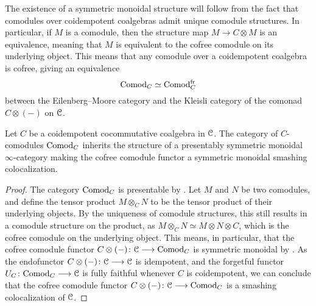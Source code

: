 \begin{remark}
    \label{ch2:rm:unique-structure}
    The existence of a symmetric monoidal structure will follow from the fact that comodules over coidempotent coalgebras admit unique comodule structures. In particular, if $M$ is a comodule, then the structure map $M \to C\otimes M$ is an equivalence, meaning that $M$ is equivalent to the cofree comodule on its underlying object. This means that any comodule over a coidempotent coalgebra is cofree, giving an equivalence 
    \[\mathrm{Comod}_C \simeq \mathrm{Comod}_C^{\mathrm{fr}}\]
    between the Eilenberg--Moore category and the Kleisli category of the comonad $C\otimes (-)$ on $\EuScript{C}$. 
\end{remark}

\begin{lemma}
    \label{ch2:lm:coidempotent-then-comod-monoidal}
    Let $C$ be a coidempotent cocommutative coalgebra in $\EuScript{C}$. The category of $C$-comodules $\mathrm{Comod}_C$ inherits the structure of a presentably symmetric monoidal $\infty$-category making the cofree comodule functor a symmetric monoidal smashing colocalization.
\end{lemma}
\begin{proof}
    The category $\mathrm{Comod}_C$ is presentable by \cite[2.1.11]{peroux_2020}. Let $M$ and $N$ be two comodules, and define the tensor product $M\otimes_C N$ to be the tensor product of their underlying objects. By the uniqueness of comodule structures, this still results in a comodule structure on the product, as $M \otimes_C N \simeq M \otimes N \otimes C$, which is the cofree comodule on the underlying object. This means, in particular, that the cofree comodule functor $C\otimes (-) \colon \EuScript{C} \longrightarrow \mathrm{Comod}_C$ is symmetric monoidal by \cite[2.2.1.9]{Lurie_HA}. As the endofunctor $C\otimes (-) \colon \EuScript{C} \longrightarrow \EuScript{C}$ is idempotent, and the forgetful functor $U_C\colon \mathrm{Comod}_C\longrightarrow \EuScript{C}$ is fully faithful whenever $C$ is coidempotent, we can conclude that the cofree comodule functor $C\otimes (-)\colon \EuScript{C}\longrightarrow \mathrm{Comod}_C$ is a smashing colocalization of $\EuScript{C}$. 
\end{proof}



